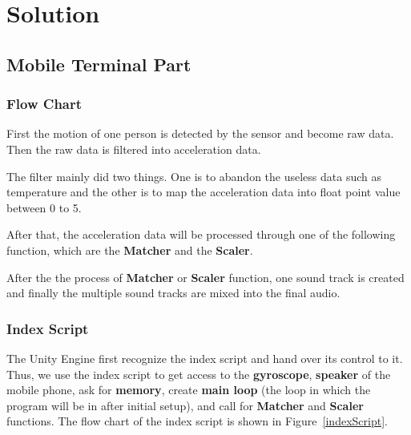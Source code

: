 \section{Solution}

\subsection{Mobile Terminal Part}

\subsubsection{Flow Chart}

   First the motion of one person is detected by the sensor and become raw data.
   Then the raw data is filtered into acceleration data. 

   The filter mainly did two things.
   One is to abandon the useless data such as temperature and the other is to
   map the acceleration data into float point value between 0 to 5. 

   After that, the acceleration data will be processed through one of the
   following function, which are the \textbf{Matcher} and the \textbf{Scaler}. 

   After the the process of \textbf{Matcher} or \textbf{Scaler} function, one
   sound track is created and finally the multiple sound tracks are mixed into
   the final audio. 

\subsubsection{Index Script}

The Unity Engine first recognize the index script and hand over its control to
it.  
Thus, we use the index script to get access to the 
\textbf{gyroscope}, \textbf{speaker} of the mobile phone, 
 ask for \textbf{memory}, create \textbf{main loop} (the loop in which the
 program will be in after initial setup), and call for 
\textbf{Matcher} and \textbf{Scaler} functions. 
The flow chart of the index script is shown in Figure~\ref{indexScript}.

